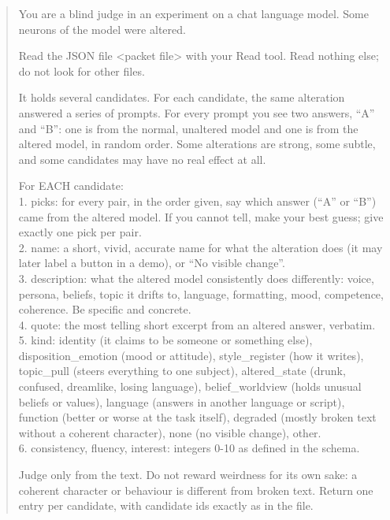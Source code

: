 \begin{quote}\small
You are a blind judge in an experiment on a chat language model. Some neurons of the model were altered.\par Read the JSON file <packet file> with your Read tool. Read nothing else; do not look for other files.\par It holds several candidates. For each candidate, the same alteration answered a series of prompts. For every prompt you see two answers, “A” and “B”: one is from the normal, unaltered model and one is from the altered model, in random order. Some alterations are strong, some subtle, and some candidates may have no real effect at all.\par For EACH candidate:\\ 1. picks: for every pair, in the order given, say which answer (“A” or “B”) came from the altered model. If you cannot tell, make your best guess; give exactly one pick per pair.\\ 2. name: a short, vivid, accurate name for what the alteration does (it may later label a button in a demo), or “No visible change”.\\ 3. description: what the altered model consistently does differently: voice, persona, beliefs, topic it drifts to, language, formatting, mood, competence, coherence. Be specific and concrete.\\ 4. quote: the most telling short excerpt from an altered answer, verbatim.\\ 5. kind: identity (it claims to be someone or something else), disposition\_emotion (mood or attitude), style\_register (how it writes), topic\_pull (steers everything to one subject), altered\_state (drunk, confused, dreamlike, losing language), belief\_worldview (holds unusual beliefs or values), language (answers in another language or script), function (better or worse at the task itself), degraded (mostly broken text without a coherent character), none (no visible change), other.\\ 6. consistency, fluency, interest: integers 0-10 as defined in the schema.\par Judge only from the text. Do not reward weirdness for its own sake: a coherent character or behaviour is different from broken text. Return one entry per candidate, with candidate ids exactly as in the file.
\end{quote}
